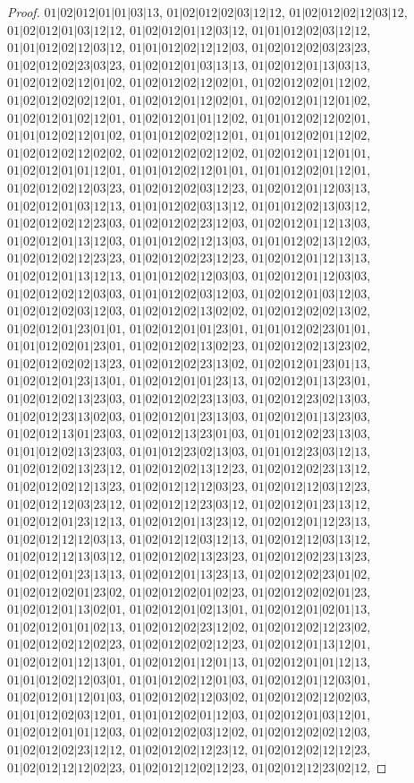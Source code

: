 \documentclass[12pt]{article}
\theoremstyle{plain}
\theoremstyle{definition}
\theoremstyle{remark}
\begin{document}
\begin{proof}
$01|02|012|01|01|03|13$, $01|02|012|02|03|12|12$, $01|02|012|02|12|03|12$, $01|02|012|01|03|12|12$, $01|02|012|01|12|03|12$, $01|01|012|02|03|12|12$, $01|01|012|02|12|03|12$, $01|01|012|02|12|12|03$, $01|02|012|02|03|23|23$, $01|02|012|02|23|03|23$, $01|02|012|01|03|13|13$, $01|02|012|01|13|03|13$, $01|02|012|02|12|01|02$, $01|02|012|02|12|02|01$, $01|02|012|02|01|12|02$, $01|02|012|02|02|12|01$, $01|02|012|01|12|02|01$, $01|02|012|01|12|01|02$, $01|02|012|01|02|12|01$, $01|02|012|01|01|12|02$, $01|01|012|02|12|02|01$, $01|01|012|02|12|01|02$, $01|01|012|02|02|12|01$, $01|01|012|02|01|12|02$, $01|02|012|02|12|02|02$, $01|02|012|02|02|12|02$, $01|02|012|01|12|01|01$, $01|02|012|01|01|12|01$, $01|01|012|02|12|01|01$, $01|01|012|02|01|12|01$, $01|02|012|02|12|03|23$, $01|02|012|02|03|12|23$, $01|02|012|01|12|03|13$, $01|02|012|01|03|12|13$, $01|01|012|02|03|13|12$, $01|01|012|02|13|03|12$, $01|02|012|02|12|23|03$, $01|02|012|02|23|12|03$, $01|02|012|01|12|13|03$, $01|02|012|01|13|12|03$, $01|01|012|02|12|13|03$, $01|01|012|02|13|12|03$, $01|02|012|02|12|23|23$, $01|02|012|02|23|12|23$, $01|02|012|01|12|13|13$, $01|02|012|01|13|12|13$, $01|01|012|02|12|03|03$, $01|02|012|01|12|03|03$, $01|02|012|02|12|03|03$, $01|01|012|02|03|12|03$, $01|02|012|01|03|12|03$, $01|02|012|02|03|12|03$, $01|02|012|02|13|02|02$, $01|02|012|02|02|13|02$, $01|02|012|01|23|01|01$, $01|02|012|01|01|23|01$, $01|01|012|02|23|01|01$, $01|01|012|02|01|23|01$, $01|02|012|02|13|02|23$, $01|02|012|02|13|23|02$, $01|02|012|02|02|13|23$, $01|02|012|02|23|13|02$, $01|02|012|01|23|01|13$, $01|02|012|01|23|13|01$, $01|02|012|01|01|23|13$, $01|02|012|01|13|23|01$, $01|02|012|02|13|23|03$, $01|02|012|02|23|13|03$, $01|02|012|23|02|13|03$, $01|02|012|23|13|02|03$, $01|02|012|01|23|13|03$, $01|02|012|01|13|23|03$, $01|02|012|13|01|23|03$, $01|02|012|13|23|01|03$, $01|01|012|02|23|13|03$, $01|01|012|02|13|23|03$, $01|01|012|23|02|13|03$, $01|01|012|23|03|12|13$, $01|02|012|02|13|23|12$, $01|02|012|02|13|12|23$, $01|02|012|02|23|13|12$, $01|02|012|02|12|13|23$, $01|02|012|12|12|03|23$, $01|02|012|12|03|12|23$, $01|02|012|12|03|23|12$, $01|02|012|12|23|03|12$, $01|02|012|01|23|13|12$, $01|02|012|01|23|12|13$, $01|02|012|01|13|23|12$, $01|02|012|01|12|23|13$, $01|02|012|12|12|03|13$, $01|02|012|12|03|12|13$, $01|02|012|12|03|13|12$, $01|02|012|12|13|03|12$, $01|02|012|02|13|23|23$, $01|02|012|02|23|13|23$, $01|02|012|01|23|13|13$, $01|02|012|01|13|23|13$, $01|02|012|02|23|01|02$, $01|02|012|02|01|23|02$, $01|02|012|02|01|02|23$, $01|02|012|02|02|01|23$, $01|02|012|01|13|02|01$, $01|02|012|01|02|13|01$, $01|02|012|01|02|01|13$, $01|02|012|01|01|02|13$, $01|02|012|02|23|12|02$, $01|02|012|02|12|23|02$, $01|02|012|02|12|02|23$, $01|02|012|02|02|12|23$, $01|02|012|01|13|12|01$, $01|02|012|01|12|13|01$, $01|02|012|01|12|01|13$, $01|02|012|01|01|12|13$, $01|01|012|02|12|03|01$, $01|01|012|02|12|01|03$, $01|02|012|01|12|03|01$, $01|02|012|01|12|01|03$, $01|02|012|02|12|03|02$, $01|02|012|02|12|02|03$, $01|01|012|02|03|12|01$, $01|01|012|02|01|12|03$, $01|02|012|01|03|12|01$, $01|02|012|01|01|12|03$, $01|02|012|02|03|12|02$, $01|02|012|02|02|12|03$, $01|02|012|02|23|12|12$, $01|02|012|02|12|23|12$, $01|02|012|02|12|12|23$, $01|02|012|12|12|02|23$, $01|02|012|12|02|12|23$, $01|02|012|12|23|02|12$, 
\end{proof}
\end{document}
